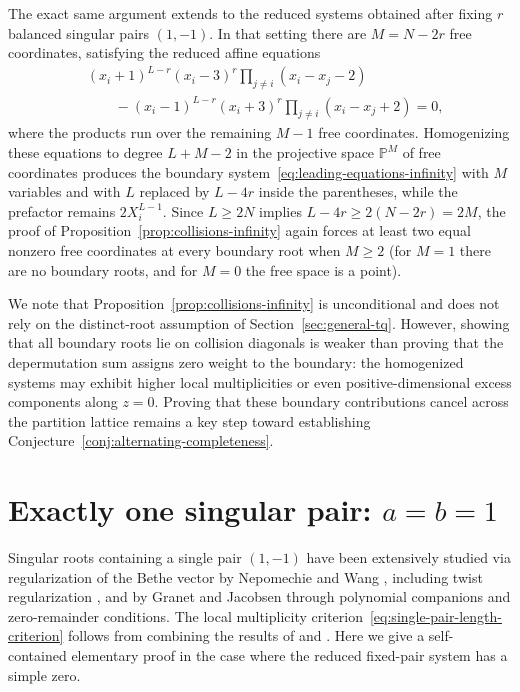 \documentclass[11pt]{article}
\theoremstyle{definition}
\begin{document}
The exact same argument extends to the reduced systems obtained after fixing $r$ balanced singular pairs $(1,-1)$.
In that setting there are $M=N-2r$ free coordinates, satisfying the reduced affine equations
\[
 \begin{aligned}
 &(x_i+1)^{L-r}(x_i-3)^r
                   \prod_{j\ne i}(x_i-x_j-2)\\
 &\qquad{}-(x_i-1)^{L-r}(x_i+3)^r
                   \prod_{j\ne i}(x_i-x_j+2)=0,
 \end{aligned}
\]
where the products run over the remaining $M-1$ free coordinates. Homogenizing these equations
to degree $L+M-2$ in the projective space $\mathbb{P}^M$ of free coordinates produces the boundary system~\eqref{eq:leading-equations-infinity} with $M$ variables
and with $L$ replaced by $L-4r$ inside the parentheses, while the prefactor remains $2X_i^{L-1}$.
Since $L\ge 2N$ implies $L-4r\ge 2(N-2r)=2M$, the proof of Proposition~\ref{prop:collisions-infinity} again forces at least two equal nonzero free
coordinates at every boundary root when $M\ge 2$ (for $M=1$ there are no boundary
roots, and for $M=0$ the free space is a point).

We note that Proposition~\ref{prop:collisions-infinity} is unconditional and does not rely on the distinct-root assumption of Section~\ref{sec:general-tq}. However, showing that all boundary roots lie on collision diagonals is weaker than proving that the depermutation sum assigns zero weight to the boundary: the homogenized systems may exhibit higher local multiplicities or even positive-dimensional excess components along $z=0$. Proving that these boundary contributions cancel across the partition lattice remains a key step toward establishing Conjecture~\ref{conj:alternating-completeness}.

\section{Exactly one singular pair: \texorpdfstring{$a=b=1$}{a=b=1}}
\label{sec:simple-reduced-one-pair}

Singular roots containing a single pair $(1,-1)$ have been extensively studied via regularization
of the Bethe vector by Nepomechie and Wang
\cite[Section~3]{NW2013}, including twist regularization
\cite[Section~2]{NW2014}, and by Granet and Jacobsen
\cite[Sections~2--4]{GJ2020} through polynomial companions and zero-remainder conditions.
The local multiplicity criterion~\eqref{eq:single-pair-length-criterion} follows from combining the results of \cite{NW2013} and \cite{MTV2009}.
Here we give a self-contained elementary proof in the case where the reduced fixed-pair system has a simple zero.
\end{document}
